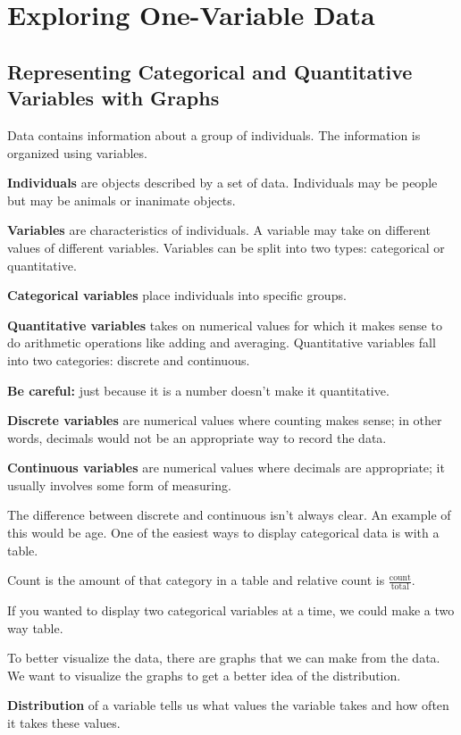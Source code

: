 \documentclass[../stats.tex]{subfiles}
\begin{document}
\chapter{Exploring One-Variable Data}
\section{Representing Categorical and Quantitative Variables with Graphs}
Data contains information about a group of individuals. The information is organized using variables.

\textbf{Individuals} are objects described by a set of data. Individuals may be people but may be animals or inanimate objects.

\textbf{Variables} are characteristics of individuals. A variable may take on different values of different variables. Variables can be split into two types: categorical or quantitative.

\textbf{Categorical variables} place individuals into specific groups.

\textbf{Quantitative variables} takes on numerical values for which it makes sense to do arithmetic operations like adding and averaging. Quantitative variables fall into two categories: discrete and continuous.

\textbf{Be careful: } just because it is a number doesn't make it quantitative.

\textbf{Discrete variables} are numerical values where counting makes sense; in other words, decimals would not be an appropriate way to record the data.

\textbf{Continuous variables} are numerical values where decimals are appropriate; it usually involves some form of measuring.

The difference between discrete and continuous isn't always clear. An example of this would be age.
\medbreak
One of the easiest ways to display categorical data is with a table.

Count is the amount of that category in a table and relative count is $\frac{\text{count}}{\text{total}}$.

If you wanted to display two categorical variables at a time, we could make a two way table.

To better visualize the data, there are graphs that we can make from the data. We want to visualize the graphs to get a better idea of the distribution.

\textbf{Distribution} of a variable tells us what values the variable takes and how often it takes these values.
\end{document}
